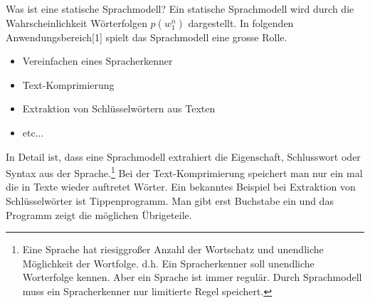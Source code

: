 
Was ist eine statische Sprachmodell? Ein statische Sprachmodell wird durch die Wahrscheinlichkeit W\"orterfolgen $p(w_{1}^n)$ dargestellt.
In folgenden Anwendungsbereich[1] spielt das Sprachmodell eine grosse Rolle.
\begin{itemize}
	\item Vereinfachen eines Spracherkenner
	\item Text-Komprimierung
	\item Extraktion von Schl\"usselw\"ortern aus Texten
	\item etc...
\end{itemize}
In Detail ist, dass eine Sprachmodell extrahiert die Eigenschaft, Schlusswort oder Syntax aus der Sprache.\footnote{Eine Sprache hat riesiggro\ss er Anzahl der Wortschatz und unendliche M\"oglichkeit der Wortfolge. d.h. Ein Spracherkenner soll unendliche Worterfolge kennen. Aber ein Sprache ist immer regul\"ar. Durch Sprachmodell muss ein Spracherkenner  nur  limitierte Regel speichert.}
Bei der Text-Komprimierung speichert man nur ein mal die in Texte wieder auftretet W\"orter. Ein bekanntes Beispiel bei Extraktion von Schl\"usselw\"orter ist Tippenprogramm. Man gibt erst Buchstabe ein und das Programm zeigt die m\"oglichen \"Ubrigeteile.
